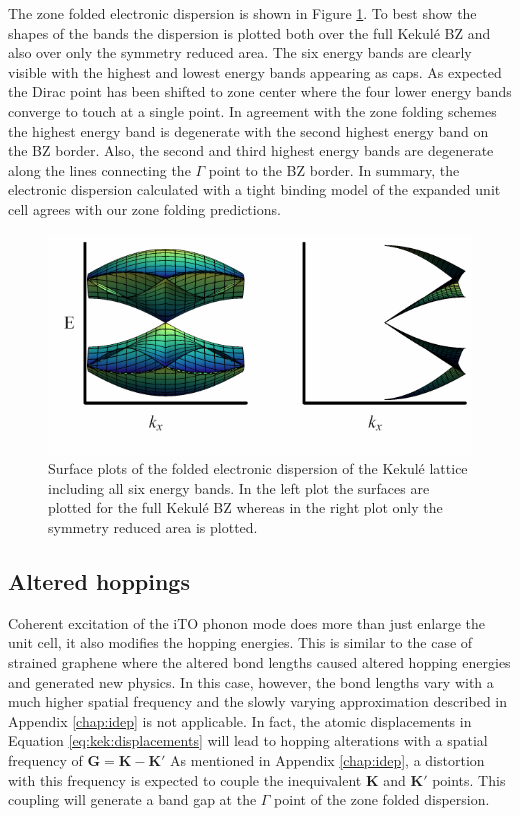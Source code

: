 The zone folded electronic dispersion is shown in Figure \ref{fig:kek:zfdisp}.
To best show the shapes of the bands the dispersion is plotted both over the full Kekul\'e BZ and also over only the symmetry reduced area.
The six energy bands are clearly visible with the highest and lowest energy bands appearing as caps.
As expected the Dirac point has been shifted to zone center where the four lower energy bands converge to touch at a single point.
In agreement with the zone folding schemes the highest energy band is degenerate with the second highest energy band on the BZ border.
Also, the second and third highest energy bands are degenerate along the lines connecting the $\Gamma$ point to the BZ border.
In summary, the electronic dispersion calculated with a tight binding model of the expanded unit cell agrees with our zone folding predictions.

\begin{figure}
	\begin{center}
	\includegraphics{Figs_Kekule/ZoneFolded.pdf}
	\end{center}
	\caption[Surface plots of the folded electronic dispersion of the Kekul\'e lattice]{\label{fig:kek:zfdisp}
		Surface plots of the folded electronic dispersion of the Kekul\'e lattice including all six energy bands.
		In the left plot the surfaces are plotted for the full Kekul\'e BZ whereas in the right plot only the symmetry reduced area is plotted.
	}
\end{figure}

\subsection{Altered hoppings}
Coherent excitation of the iTO phonon mode does more than just enlarge the unit cell, it also modifies the hopping energies.
This is similar to the case of strained graphene where the altered bond lengths caused altered hopping energies and generated new physics.
In this case, however, the bond lengths vary with a much higher spatial frequency and the slowly varying approximation described in Appendix \ref{chap:idep} is not applicable.
In fact, the atomic displacements in Equation \ref{eq:kek:displacements} will lead to hopping alterations with a spatial frequency of $\bm{G}=\bm{K}-\bm{K'}$
As mentioned in Appendix \ref{chap:idep}, a distortion with this frequency is expected to couple the inequivalent $\bm{K}$ and $\bm{K'}$ points.
This coupling will generate a band gap at the $\Gamma$ point of the zone folded dispersion.

